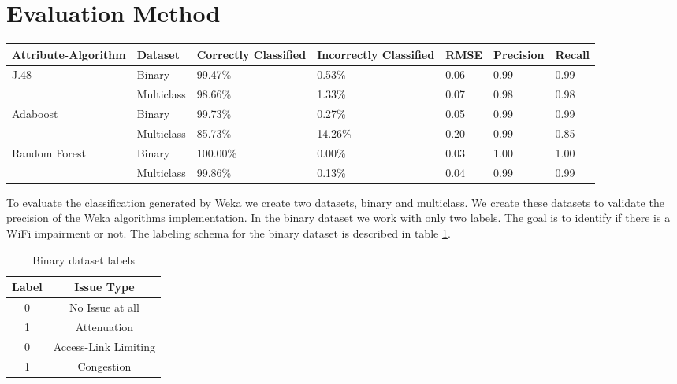 \section{Evaluation Method}\label{Evaluation_Method}

\begin{table*}[!bp]
	\begin{center}
		\begin{tabular}{|| m{2.5cm} | m{2cm} | m{2cm}| m{2cm} | m{2cm}| m{2cm} | m{2cm}  ||}
			\hline
			Attribute-Algorithm & Dataset & Correctly Classified & Incorrectly Classified & RMSE & Precision & Recall \\ [0.5ex] 
			\hline\hline
			\multirow{2}{*}{J.48} & Binary & 99.47\% & 0.53\% & 0.06 & 0.99 & 0.99 \\
			& Multiclass & 98.66\% & 1.33\% & 0.07 & 0.98 & 0.98 \\
			\multirow{2}{*}{Adaboost} & Binary & 99.73\% & 0.27\% & 0.05 & 0.99 & 0.99 \\
			& Multiclass & 85.73\% & 14.26\% & 0.20 & 0.99 & 0.85 \\
			\multirow{2}{*}{Random Forest} & Binary & 100.00\% & 0.00\% & 0.03 & 1.00 & 1.00 \\
			& Multiclass & 99.86\% & 0.13\% & 0.04 & 0.99 & 0.99 \\
			\hline
		\end{tabular}
		\caption{Classification Results}
		\label{table:classification_results}
	\end{center}
\end{table*}

To evaluate the classification generated by Weka we create two datasets, binary and multiclass. We create these datasets to validate the precision of the Weka algorithms implementation. In the binary dataset we work with only two labels. The goal is to identify if there is a WiFi impairment or not. The labeling schema for the binary dataset is described in table \ref{table:binary_labels}.

\begin{table}[H]
	\begin{center}
		\begin{tabular}{||c c||} 
			\hline
			Label & Issue Type\\ [0.5ex] 
			\hline\hline
			0 & No Issue at all \\ 
			\hline
			1 & Attenuation\\
			\hline
			0 & Access-Link Limiting \\
			\hline
			1 & Congestion \\[1ex] 
			\hline
		\end{tabular}
		\caption{Binary dataset labels}
		\label{table:binary_labels}
	\end{center}
\end{table}

